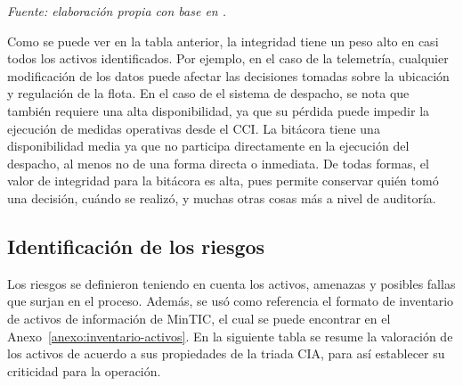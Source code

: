 \begin{flushleft}
	\footnotesize
	\textit{Fuente: elaboración propia con base en \parencite{mintic2021,transmilenio2025pesi,transmilenio2026cci}.}
\end{flushleft}

Como se puede ver en la tabla anterior, la integridad tiene un peso alto en casi todos los activos identificados. Por ejemplo, en el caso de la telemetría, cualquier modificación de los datos puede afectar las decisiones tomadas sobre la ubicación y regulación de la flota. En el caso de el sistema de despacho, se nota que también requiere una alta disponibilidad, ya que su pérdida puede impedir la ejecución de medidas operativas desde el CCI. La bitácora tiene una disponibilidad media ya que no participa directamente en la ejecución del despacho, al menos no de una forma directa o inmediata. De todas formas, el valor de integridad para la bitácora es alta, pues permite conservar quién tomó una decisión, cuándo se realizó, y muchas otras cosas más a nivel de auditoría.

\subsection{Identificación de los riesgos}

Los riesgos se definieron teniendo en cuenta los activos, amenazas y posibles fallas que surjan en el proceso. Además, se usó como referencia el formato de inventario de activos de información de MinTIC, el cual se puede encontrar en el Anexo~\ref{anexo:inventario-activos}. En la siguiente tabla se resume la valoración de los activos de acuerdo a sus propiedades de la triada CIA, para así establecer su criticidad para la operación.

